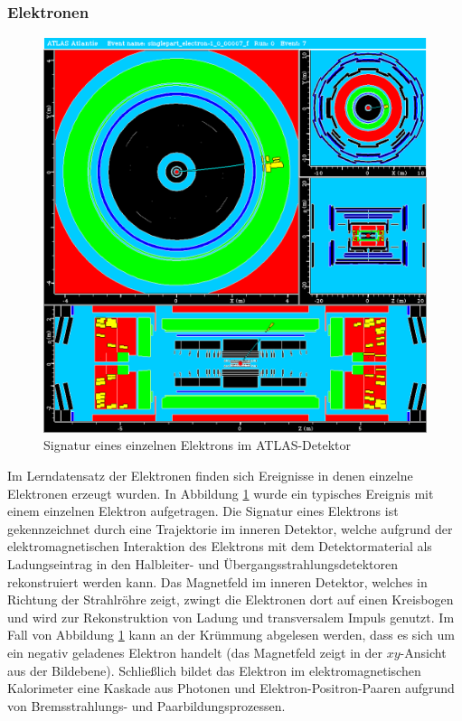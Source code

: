 \documentclass[11pt, a4paper]{article}
\numberwithin{equation}{section}
\begin{document}
\subsubsection{Elektronen}
\begin{figure}[htbp]
	\centering
	\includegraphics[width=1.0\textwidth]{./data/atlantis/singlepart_events_new/electron/curvature.png}
	\caption{Signatur eines einzelnen Elektrons im ATLAS-Detektor}
	\label{fig:electron-curvature}
\end{figure}
\vfill
\noindent
Im Lerndatensatz der Elektronen finden sich Ereignisse in denen einzelne Elektronen erzeugt wurden.
In Abbildung \ref{fig:electron-curvature} wurde ein typisches Ereignis mit einem einzelnen Elektron aufgetragen.
Die Signatur eines Elektrons ist gekennzeichnet durch eine Trajektorie im inneren Detektor, welche aufgrund der elektromagnetischen Interaktion des Elektrons mit dem Detektormaterial als Ladungseintrag in den Halbleiter- und Übergangsstrahlungsdetektoren rekonstruiert werden kann.
Das Magnetfeld im inneren Detektor, welches in Richtung der Strahlröhre zeigt, zwingt die Elektronen dort auf einen Kreisbogen und wird zur Rekonstruktion von Ladung und transversalem Impuls genutzt.
Im Fall von Abbildung \ref{fig:electron-curvature} kann an der Krümmung abgelesen werden, dass es sich um ein negativ geladenes Elektron handelt (das Magnetfeld zeigt in der $xy$-Ansicht aus der Bildebene).
Schließlich bildet das Elektron im elektromagnetischen Kalorimeter eine Kaskade aus Photonen und Elektron-Positron-Paaren aufgrund von Bremsstrahlungs- und Paarbildungsprozessen.
\vfill
\end{document}
